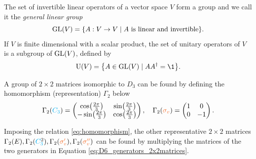 \begin{definition} \label{def:groups_of_matrices}
The set of invertible linear operators of a vector space $V$ form a group and we call it the \textit{general linear group}
\begin{equation} \label{eq:general_linear_GL(V)}
{\text{GL}}(V) = \qty{A: V \to V \mid A \text{ is linear and invertible}}.
\end{equation}
If $V$ is finite dimensional with a scalar product, the set of unitary operators of $V$ is a subgroup of ${\text{GL}}(V)$, defined by
\begin{equation} \label{eq:unitary_operators_U(V)}
\U(V) = \qty{A \in \GL(V) \mid A A^\dagger = \1}.
\end{equation}
\end{definition}

\begin{example} \label{ex:2x2_rep}
A group of $2\times 2$ matrices isomorphic to $D_3$ can be found by defining the homomorphism (representation) $\Gamma_2$ below
\begin{equation} \label{eq:D6_generators_2x2matrices}
\Gamma_2(\Ct) =
\begin{pmatrix}
\cos(\frac{2\pi}{3}) & \sin(\frac{2\pi}{3}) \\
-\sin(\frac{2\pi}{3}) & \cos(\frac{2\pi}{3})
\end{pmatrix},
\quad
\Gamma_2(\sv) =
\begin{pmatrix}
1 & 0 \\
0 & -1
\end{pmatrix}.
\end{equation}

Imposing the relation \ref{eq:homomorphism}, the other representative $2\times 2$ matrices $\Gamma_2(E), \Gamma_2(\Ctn{2}), \Gamma_2(\svp), \Gamma_2(\svpp)$ can be found by multiplying the matrices of the two generators in Equation \ref{eq:D6_generators_2x2matrices}.
\end{example}

